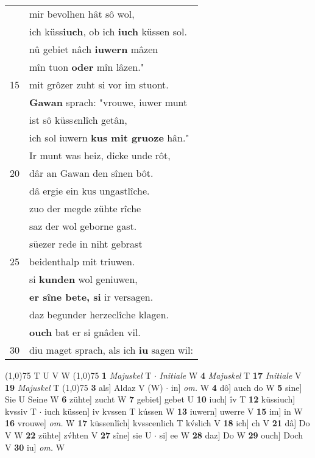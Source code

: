 \documentclass[8pt,a4paper,notitlepage]{article}
\begin{document}
\begin{table}[ht]
\begin{minipage}[t]{0.5\linewidth}
\begin{tabular}{rl}
 & mir bevolhen hât sô wol,\\ 
 & ich küss\textbf{iuch}, ob ich \textbf{iuch} küssen sol.\\ 
 & nû gebiet nâch \textbf{iuwern} mâzen\\ 
 & mîn tuon \textbf{oder} mîn lâzen."\\ 
15 & mit grôzer zuht si vor im stuont.\\ 
 & \textbf{Gawan} sprach: "vrouwe, iuwer munt\\ 
 & ist sô küss\textit{e}nlîch getân,\\ 
 & ich sol iuwern \textbf{kus mit gruoze} hân."\\ 
 & Ir munt was heiz, dicke unde rôt,\\ 
20 & dâr an Gawan den sînen bôt.\\ 
 & dâ ergie ein kus ungastlîche.\\ 
 & zuo der megde zühte rîche\\ 
 & saz der wol geborne gast.\\ 
 & süezer rede in niht gebrast\\ 
25 & beidenthalp mit triuwen.\\ 
 & si \textbf{kunden} wol geniuwen,\\ 
 & \textbf{er sîne bete, si} ir versagen.\\ 
 & daz begunder herzeclîche klagen.\\ 
 & \textbf{ouch} bat er si gnâden vil.\\ 
30 & diu maget sprach, als ich \textbf{iu} sagen wil:\\ 
\end{tabular}
\scriptsize
\line(1,0){75} \newline
T U V W \newline
\line(1,0){75} \newline
\textbf{1} \textit{Majuskel} T   $\cdot$ \textit{Initiale} W  \textbf{4} \textit{Majuskel} T  \textbf{17} \textit{Initiale} V  \textbf{19} \textit{Majuskel} T  \newline
\line(1,0){75} \newline
\textbf{3} als] Aldaz V (W)  $\cdot$ in] \textit{om.} W \textbf{4} dô] auch do W \textbf{5} sine] Sie U Seine W \textbf{6} zühte] zucht W \textbf{7} gebiet] gebet U \textbf{10} iuch] îv T \textbf{12} küssiuch] kvssiv T  $\cdot$ iuch küssen] iv kvssen T kússen W \textbf{13} iuwern] uwerre V \textbf{15} im] in W \textbf{16} vrouwe] \textit{om.} W \textbf{17} küssenlîch] kvsscenlich T kv́slich V \textbf{18} ich] ch V \textbf{21} dâ] Do V W \textbf{22} zühte] zv́hten V \textbf{27} sîne] sie U  $\cdot$ si] ee W \textbf{28} daz] Do W \textbf{29} ouch] Doch V \textbf{30} iu] \textit{om.} W \newline
\end{minipage}
\end{table}
\end{document}
